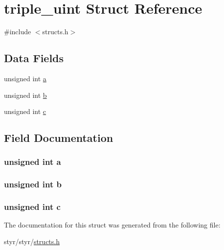 \hypertarget{structtriple__uint}{}\section{triple\+\_\+uint Struct Reference}
\label{structtriple__uint}


{\ttfamily \#include $<$structs.\+h$>$}

\subsection*{Data Fields}
\begin{DoxyCompactItemize}
\item 
unsigned int \hyperlink{structtriple__uint_a0ea8a85723620c90be9fd2a693f12a59}{a}
\item 
unsigned int \hyperlink{structtriple__uint_a790d5baa17ec7aaf7bb49750a16e9c29}{b}
\item 
unsigned int \hyperlink{structtriple__uint_a6ce17b018c47d0f1d0e53a458f741ad3}{c}
\end{DoxyCompactItemize}


\subsection{Field Documentation}
\subsubsection[{\texorpdfstring{a}{a}}]{\setlength{\rightskip}{0pt plus 5cm}unsigned int a}\hypertarget{structtriple__uint_a0ea8a85723620c90be9fd2a693f12a59}{}\label{structtriple__uint_a0ea8a85723620c90be9fd2a693f12a59}
\subsubsection[{\texorpdfstring{b}{b}}]{\setlength{\rightskip}{0pt plus 5cm}unsigned int b}\hypertarget{structtriple__uint_a790d5baa17ec7aaf7bb49750a16e9c29}{}\label{structtriple__uint_a790d5baa17ec7aaf7bb49750a16e9c29}
\subsubsection[{\texorpdfstring{c}{c}}]{\setlength{\rightskip}{0pt plus 5cm}unsigned int c}\hypertarget{structtriple__uint_a6ce17b018c47d0f1d0e53a458f741ad3}{}\label{structtriple__uint_a6ce17b018c47d0f1d0e53a458f741ad3}


The documentation for this struct was generated from the following file\+:\begin{DoxyCompactItemize}
\item 
styr/styr/\hyperlink{structs_8h}{structs.\+h}\end{DoxyCompactItemize}
